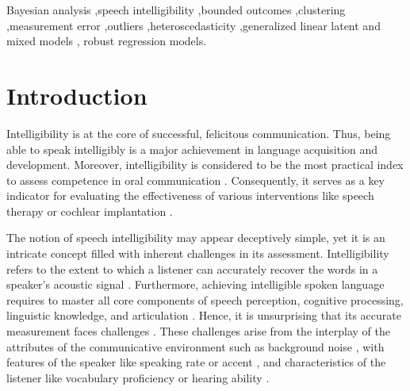 \documentclass[
  authoryear,
  preprint,
  1p]{elsarticle}
\begin{document}
\begin{frontmatter}
\begin{keyword}
    Bayesian analysis \sep speech intelligibility \sep bounded
outcomes \sep clustering \sep measurement
error \sep outliers \sep heteroscedasticity \sep generalized linear
latent and mixed models \sep 
    robust regression models.
\end{keyword}
\end{frontmatter}
    
\section{Introduction}\label{sec-introduction}

Intelligibility is at the core of successful, felicitous communication.
Thus, being able to speak intelligibly is a major achievement in
language acquisition and development. Moreover, intelligibility is
considered to be the most practical index to assess competence in oral
communication \citep{Kent_et_al_1994}. Consequently, it serves as a key
indicator for evaluating the effectiveness of various interventions like
speech therapy or cochlear implantation \citep{Chin_et_al_2012}.

The notion of speech intelligibility may appear deceptively simple, yet
it is an intricate concept filled with inherent challenges in its
assessment. Intelligibility refers to the extent to which a listener can
accurately recover the words in a speaker's acoustic signal
\citep{Freeman_et_al_2017, vanHeuven_2008, Whitehill_et_al_2004}.
Furthermore, achieving intelligible spoken language requires to master
all core components of speech perception, cognitive processing,
linguistic knowledge, and articulation \citep{Freeman_et_al_2017}.
Hence, it is unsurprising that its accurate measurement faces challenges
\citep{Kent_et_al_1989}. These challenges arise from the interplay of
the attributes of the communicative environment such as background noise
\citep{Munro_1998}, with features of the speaker like speaking rate
\citep{Munro_et_al_1998} or accent
\citep{Jenkins_2000, Ockey_et_al_2016}, and characteristics of the
listener like vocabulary proficiency or hearing ability
\citep{Varonis_et_al_1985}.
\end{document}
